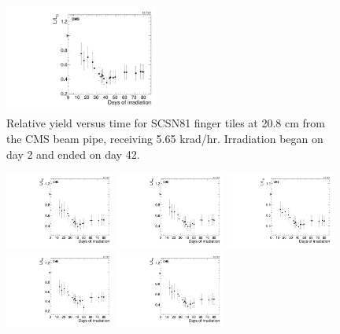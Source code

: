 \begin{figure}[tbp!]
\includegraphics[width=0.45\textwidth]{figures/SCSN81-F-20p8cm-f20ch3-time.pdf}
\caption{Relative yield versus time for SCSN81 finger tiles at 20.8 cm from the CMS beam pipe, receiving 5.65 krad/hr. Irradiation began on day 2 and ended on day 42.}
\label{fig:SCSN81-F-20p8cm-time}
\end{figure} 

\begin{figure}[tbp!]
\centering
\includegraphics[width=0.32\textwidth]{figures/SCSN81-F-27p2cm-f2ch5-time.pdf}
\includegraphics[width=0.32\textwidth]{figures/SCSN81-F-27p2cm-f3ch5-time.pdf}
\includegraphics[width=0.32\textwidth]{figures/SCSN81-F-27p2cm-f4ch0-time.pdf}
\includegraphics[width=0.32\textwidth]{figures/SCSN81-F-27p2cm-f6ch1-time.pdf}
\includegraphics[width=0.32\textwidth]{figures/SCSN81-F-27p2cm-f8ch4-time.pdf}

\end{figure}
